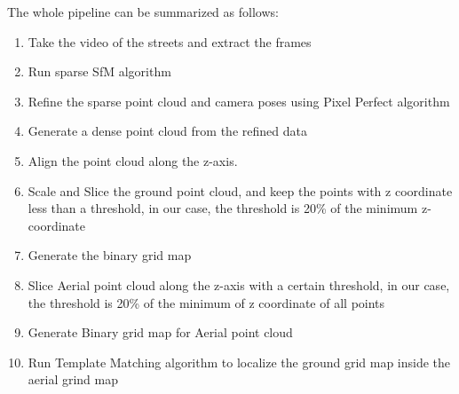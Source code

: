 \documentclass[11pt]{article}
\begin{document}
    The whole pipeline can be summarized as follows:
    \begin{enumerate}
        \item Take the video of the streets and extract the frames
        \item Run sparse SfM algorithm
        \item Refine the sparse point cloud and camera poses using Pixel Perfect algorithm
        \item Generate a dense point cloud from the refined data
        \item Align the point cloud along the z-axis.
        \item Scale and Slice the ground point cloud, and keep the points with z coordinate less than a threshold,
        in our case, the threshold is 20\% of the minimum z-coordinate
        \item Generate the binary grid map
        \item Slice Aerial point cloud along the z-axis with a certain threshold, in our case, the threshold is 20\%
        of the minimum of z coordinate of all points
        \item Generate Binary grid map for Aerial point cloud
        \item Run Template Matching algorithm to localize the ground grid map inside the aerial grind map
    \end{enumerate}
\end{document}
